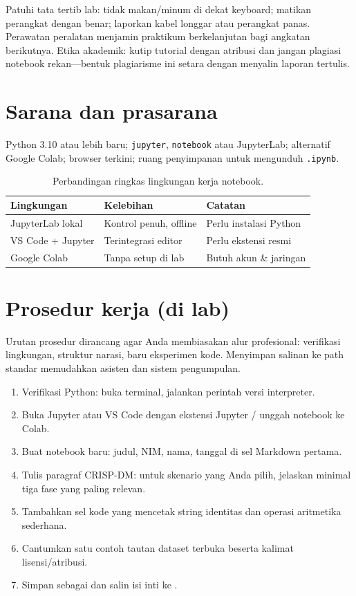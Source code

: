 \documentclass[../main.tex]{subfiles}
\begin{document}
Patuhi tata tertib lab: tidak makan/minum di dekat keyboard; matikan perangkat dengan benar; laporkan kabel longgar atau perangkat panas. Perawatan peralatan menjamin praktikum berkelanjutan bagi angkatan berikutnya.
Etika akademik: kutip tutorial dengan atribusi dan jangan plagiasi notebook rekan---bentuk plagiarisme ini setara dengan menyalin laporan tertulis.

\section{Sarana dan prasarana}

Python 3.10 atau lebih baru; \texttt{jupyter}, \texttt{notebook} atau JupyterLab; alternatif Google Colab; browser terkini; ruang penyimpanan untuk mengunduh \texttt{.ipynb}.

\begin{table}[htbp]
\centering
\caption{Perbandingan ringkas lingkungan kerja notebook.}
\label{tab:lingkungan-jupyter}
\begin{tabular}{@{}p{3cm}p{4.5cm}p{4.5cm}@{}}
\toprule
\textbf{Lingkungan} & \textbf{Kelebihan} & \textbf{Catatan} \\
\midrule
JupyterLab lokal & Kontrol penuh, offline & Perlu instalasi Python \\
VS Code + Jupyter & Terintegrasi editor & Perlu ekstensi resmi \\
Google Colab & Tanpa setup di lab & Butuh akun \& jaringan \\
\bottomrule
\end{tabular}
\end{table}

\section{Prosedur kerja (di lab)}

Urutan prosedur dirancang agar Anda membiasakan alur profesional: verifikasi lingkungan, struktur narasi, baru eksperimen kode. Menyimpan salinan ke path standar  memudahkan asisten dan sistem pengumpulan.

\begin{enumerate}[leftmargin=*]
  \item Verifikasi Python: buka terminal, jalankan perintah versi interpreter.
  \item Buka Jupyter atau VS Code dengan ekstensi Jupyter / unggah notebook ke Colab.
  \item Buat notebook baru: judul, NIM, nama, tanggal di sel Markdown pertama.
  \item Tulis paragraf CRISP-DM: untuk skenario yang Anda pilih, jelaskan minimal tiga fase yang paling relevan.
  \item Tambahkan sel kode yang mencetak string identitas dan operasi aritmetika sederhana.
  \item Cantumkan satu contoh tautan dataset terbuka beserta kalimat lisensi/atribusi.
  \item Simpan sebagai  dan salin isi inti ke .
\end{enumerate}
\end{document}
